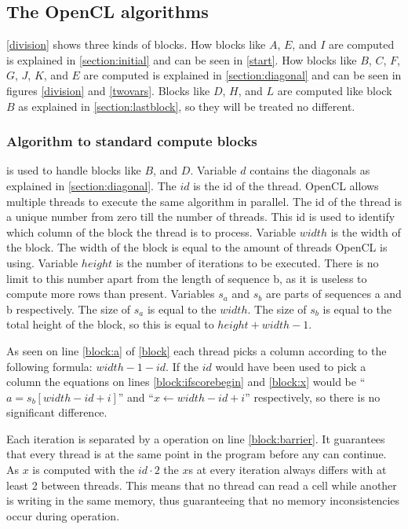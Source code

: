 \subsection{The OpenCL algorithms} \label{algorithms}
\cref{division} shows three kinds of blocks.
How blocks like $A$, $E$, and $I$ are computed is explained in \cref{section:initial} and can be seen in \cref{start}.
How blocks like $B$, $C$, $F$, $G$, $J$, $K$, and $E$ are computed is explained in \cref{section:diagonal} and can be seen in figures \ref{division} and \ref{twovars}.
Blocks like $D$, $H$, and $L$ are computed like block $B$ as explained in \cref{section:lastblock}, so they will be treated no different.

\subsubsection{Algorithm to standard compute blocks}
 is used to handle blocks like $B$, and $D$.
Variable $d$ contains the diagonals as explained in \cref{section:diagonal}.
The $id$ is the id of the thread.
OpenCL allows multiple threads to execute the same algorithm in parallel.
The id of the thread is a unique number from zero till the number of threads.
This id is used to identify which column of the block the thread is to process.
Variable $width$ is the width of the block.
The width of the block is equal to the amount of threads OpenCL is using.
Variable $height$ is the number of iterations to be executed.
There is no limit to this number apart from the length of sequence b, as it is useless to compute more rows than present.
Variables $s_a$ and $s_b$ are parts of sequences a and b respectively.
The size of $s_a$ is equal to the $width$.
The size of $s_b$ is equal to the total height of the block, so this is equal to $height + width - 1$.

As seen on line \ref{block:a} of \cref{block} each thread picks a column according to the following formula: $width - 1 - id$.
If the $id$ would have been used to pick a column the equations on lines \ref{block:ifscorebegin} and \ref{block:x} would be ``$a = s_b[width - id + i]$'' and ``$x \gets width - id + i$'' respectively, so there is no significant difference.

Each iteration is separated by a  operation on line \ref{block:barrier}.
It guarantees that every thread is at the same point in the program before any can continue.
As $x$ is computed with the $id \cdot 2$ the $x$s at every iteration always differs with at least 2 between threads.
This means that no thread can read a cell while another is writing in the same memory, thus guaranteeing that no memory inconsistencies occur during operation.

